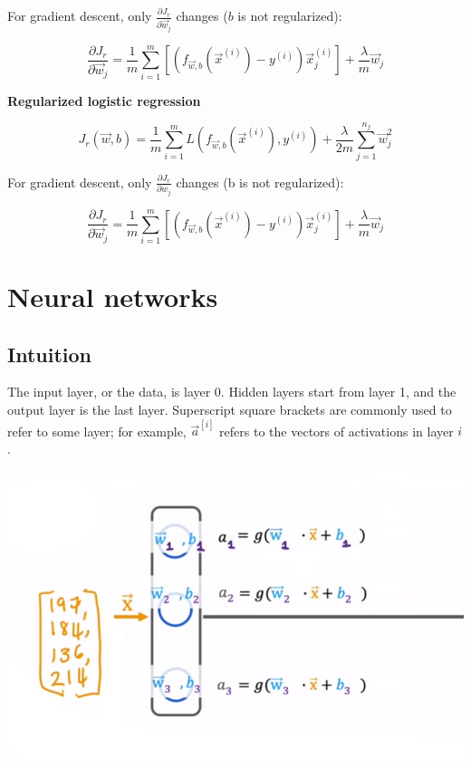 \documentclass[12pt]{article}
\begin{document}
For gradient descent, only $\frac{\partial J_r}{\partial \vec{w}_j}$ changes ($b$ is not regularized):

\[ \frac{\partial J_r}{\partial \vec{w}_j} = \frac{1}{m} \sum_{i=1}^m \left[(f_{\vec{w},b}(\vec x^{(i)}) - y^{(i)})\vec{x}^{(i)}_j\right] + \frac{\lambda}{m} \vec{w}_j \]

\noindent \textbf{Regularized logistic regression}

\[ J_r(\vec{w},b) = \frac{1}{m} \sum_{i=1}^m L(f_{\vec{w},b}(\vec{x}^{(i)}), y^{(i)}) + \frac{\lambda}{2m} \sum_{j=1}^{n_f} \vec{w}_j^2 \]

For gradient descent, only $\frac{\partial J_r}{\partial w_j}$ changes (b is not regularized):

\[ \frac{\partial J_r}{\partial \vec{w}_j} = \frac{1}{m} \sum_{i=1}^m \left[(f_{\vec{w},b}(\vec{x}^{(i)}) - y^{(i)})\vec{x}^{(i)}_j\right] + \frac{\lambda}{m} \vec{w}_j \]

\pagebreak

\section{Neural networks}

\subsection{Intuition}

The input layer, or the data, is layer 0. Hidden layers start from layer 1, and the
output layer is the last layer. Superscript square brackets are commonly used
to refer to some layer; for example, $\vec a^{[i]}$ refers to the vectors of
activations in layer $i$.

\includegraphics[scale=.5]{images/nn-intuition.png}
\end{document}
